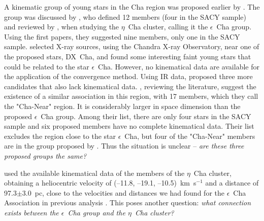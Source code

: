 \documentclass[11pt,twoside]{book}
\begin{document}
A kinematic group of young stars in the Cha region was proposed earlier by \citet{frink98}.
The group was discussed by \citet{terranegra99}, who defined 12 members (four in the SACY sample)
and reviewed by \citet{mamajek00}, when studying the $\eta$~Cha cluster,
calling it the  $\epsilon$~Cha group.
Using the first papers, they suggested nine members, only one in the SACY sample.
\citet{feige03} selected X-ray sources, using the
Chandra X-ray Observatory, near one of the proposed stars, DX~Cha, and found
some interesting faint young stars that could be related to the star $\epsilon$~Cha.
However, no kinematical data are available for the application of the convergence method.
Using IR data, \citet{luhman04} proposed three more candidates that also lack  kinematical data.
\citet{zuckerman04}, reviewing the literature, suggest the existence of  a similar association in this
region, with 17 members, which they call the "Cha-Near" region.
It is considerably larger in space dimension than the proposed $\epsilon$~Cha group.
Among their list, there are only four stars in the SACY sample and
six proposed members have no complete kinematical data.
Their list excludes the region close to the star  $\epsilon$~Cha,
but four of the "Cha-Near" members  are in the group proposed by \citet{mamajek00}.
Thus the situation is unclear -- {\it are these three proposed groups the same? }

\citet{mamajek00} used the available kinematical data of the members of the  $\eta$~Cha cluster,
obtaining a heliocentric velocity of  (--11.8, --19.1, --10.5)~km~s$^{-1}$ and a
distance of 97.3$\pm$3.0~pc, close to the velocities and distances we had found
for the $\epsilon$~Cha Association in previous analysis \citep{torres03a, torres03}.
This poses another question:
{\it what connection exists between the $\epsilon$~Cha group and the $\eta$~Cha cluster?}
\end{document}
